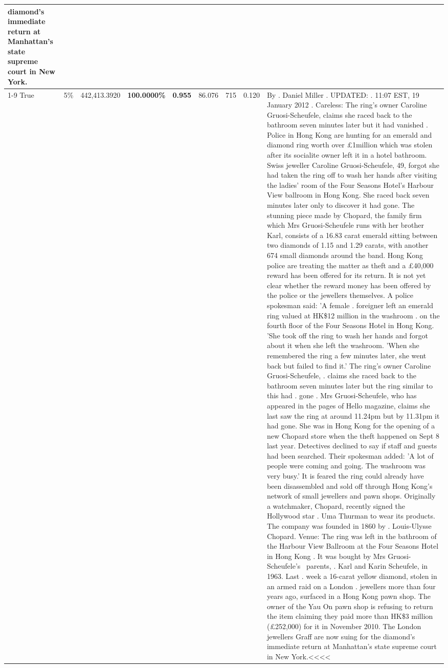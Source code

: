 \begin{table}[H]
\begin{tabular}{lllrlllll}
diamond’s immediate return at Manhattan’s state supreme court in New York.

 \\
\cline{1-9} \cline{2-9}
True & 5\% & 442,413.3920 & \bfseries \color{red} 100.0000\% & \bfseries \color{red} 0.955 & 86.076 & 715 & 0.120 & By . Daniel Miller . UPDATED: . 11:07 EST, 19 January 2012 . Careless: The ring's owner Caroline Gruosi-Scheufele, claims she raced back to the bathroom seven minutes later but it had vanished . Police in Hong Kong are hunting for an emerald and diamond ring worth over £1million which was stolen after its socialite owner left it in a hotel bathroom. Swiss jeweller Caroline Gruosi-Scheufele, 49, forgot she had taken the ring off to wash her hands after visiting the ladies' room of the Four Seasons Hotel's Harbour View ballroom in Hong Kong. She raced back seven minutes later only to discover it had gone. The stunning piece made by Chopard, the family firm which Mrs Gruosi-Scheufele runs with her brother Karl, consists of a 16.83 carat emerald sitting between two diamonds of 1.15 and 1.29 carats, with another 674 small diamonds around the band. Hong Kong police are treating the matter as theft and a £40,000 reward has been offered for its return. It is not yet clear whether the reward money has been offered by the police or the jewellers themselves. A police spokesman said: 'A female . foreigner left an emerald ring valued at HK\$12 million in the washroom . on the fourth floor of the Four Seasons Hotel in Hong Kong. 'She took off the ring to wash her hands and forgot about it when she left the washroom. 'When she remembered the ring a few minutes later, she went back but failed to find it.' The ring's owner Caroline Gruosi-Scheufele, . claims she raced back to the bathroom seven minutes later but the ring similar to this had . gone . Mrs Gruosi-Scheufele, who has appeared in the pages of Hello magazine, claims she last saw the ring at around 11.24pm but by 11.31pm it had gone. She was in Hong Kong for the opening of a new Chopard store when the theft happened on Sept 8 last year. Detectives declined to say if staff and guests had been searched. Their spokesman added: 'A lot of people were coming and going. The washroom was very busy.' It is feared the ring could already have been disassembled and sold off through Hong Kong's network of small jewellers and pawn shops. Originally a watchmaker, Chopard, recently signed the Hollywood star . Uma Thurman to wear its products. The company was founded in 1860 by . Louis-Ulysse Chopard. Venue: The ring was left in the bathroom of the Harbour View Ballroom at the Four Seasons Hotel in Hong Kong . It was bought by Mrs Gruosi-Scheufele's  parents, . Karl and Karin Scheufele, in 1963. Last . week a 16-carat yellow diamond, stolen in an armed raid on a London . jewellers more than four years ago, surfaced in a Hong Kong pawn shop. The owner of the Yau On pawn shop is refusing to return the item claiming they paid more than HK\$3 million (£252,000) for it in November 2010. The London jewellers Graff are now suing for the diamond’s immediate return at Manhattan’s state supreme court in New York.<<<< \\

\end{tabular}
\end{table}
